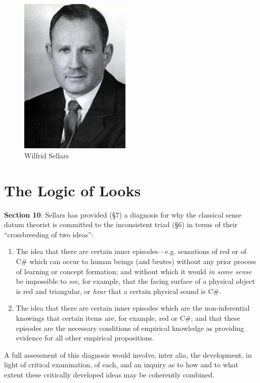 \documentclass[11pt]{article}
\title{\mytitle\\
\mysubtitle}
\author{\myauthor}
\date{} %
\begin{document}
\maketitle

\setlength{\parindent}{1em}


\begin{figure}[htbp]
	\centering
		\includegraphics[scale=0.5]{../graphics/sellars.jpeg}
	\caption{Wilfrid Sellars}
	\label{fig:sellars}
\end{figure}

\section{The Logic of Looks} %
\label{sec:the_logic_of_looks}

\textbf{Section 10}: Sellars has provided (§7) a diagnosis for why the classical sense datum theorist is committed to the inconsistent triad (§6) in terms of their ``crossbreeding of two ideas'':
\begin{enumerate}
    \item The idea that there are certain inner episodes---e.g. sensations of red or of C\# which can occur to human beings (and brutes) without any prior process of learning or concept formation; and without which it would \emph{in some sense} be impossible to \emph{see}, for example, that the facing surface of a physical object is red and triangular, or \emph{hear} that a certain physical sound is C\#.
    \item The idea that there are certain inner episodes which are the non-inferential knowings that certain items are, for example, red or C\#; and that these episodes are the necessary conditions of empirical knowledge as providing evidence for all other empirical propositions.
\end{enumerate}
A full assessment of this diagnosis would involve, inter alia, the development, in light of critical examination, of each, and an inquiry as to how and to what extent these critically developed ideas may be coherently combined. 
\end{document}

